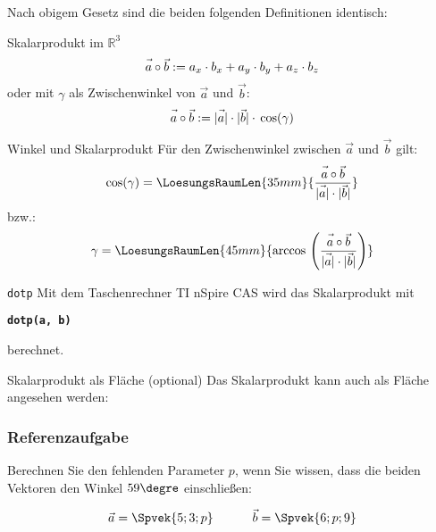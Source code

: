 Nach obigem Gesetz sind die beiden folgenden Definitionen identisch:
\begin{definition}{Skalarprodukt im $\mathbb{R}^3$}{}
  $$\vec{a\vphantom{b}}\circ\vec{b} := a_x\cdot{}b_x + a_y \cdot{} b_y + a_z\cdot{}b_z$$
oder mit $\gamma$ als Zwischenwinkel von $\vec{a}$ und $\vec{b}$:
  $$\vec{a\vphantom{b}}\circ\vec{b} := |\vec{\vphantom{b}a}| \cdot{} |\vec{b}| \cdot{}\cos({\gamma})$$
\end{definition}



\begin{gesetz}{Winkel und Skalarprodukt}{}
Für den Zwischenwinkel zwischen $\vec{a}$ und $\vec{b}$ gilt:
  $$\cos(\gamma) = \LoesungsRaumLen{35mm}{\frac{\vec{a\vphantom{b}}\circ\vec{b}}{|\vec{\vphantom{b}a}|\cdot |\vec{\vphantom{b}b}|}}$$
  bzw.:
  $$\gamma = \LoesungsRaumLen{45mm}{\arccos{} \left(\frac{\vec{a\vphantom{b}}\circ\vec{b}}{|\vec{\vphantom{b}a}|\cdot |\vec{\vphantom{b}b}|}\right)}$$
  
\end{gesetz}

\begin{bemerkung}{\texttt{dotp}}{}
Mit dem Taschenrechner TI nSpire CAS wird das Skalarprodukt mit

\begin{center}\textbf\texttt{dotp(a, b)}\end{center}

berechnet.

\end{bemerkung}


\begin{bemerkung}{Skalarprodukt als Fläche (optional)}{}
  Das Skalarprodukt kann auch als Fläche angesehen werden:
  
\end{bemerkung}
\newpage


\subsubsection{Referenzaufgabe}
Berechnen Sie den fehlenden Parameter $p$, wenn Sie wissen, dass die
beiden Vektoren den Winkel $59\degre$ einschließen:

$$\vec{a} = \Spvek{5;3;p} \hspace{11mm} \vec{b} = \Spvek{6;p;9}$$

